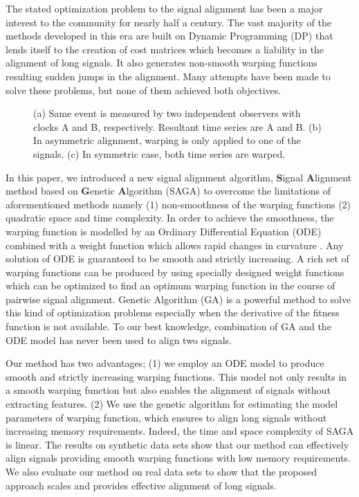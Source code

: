 \documentclass[number,1p,12pt]{elsarticle}
\begin{document}
The stated optimization problem to the signal alignment has been a major interest to the community for nearly half a century. The vast majority of the methods developed in this era are built on Dynamic Programming (DP) \cite{Bellman2003} that lends itself to the creation of cost matrices which becomes a liability in the alignment of long signals. It also generates non-smooth warping functions resulting sudden jumps in the alignment. Many attempts have been made to solve these problems, but none of them achieved both objectives. 

\begin{figure}
\centering
{}\hspace{1cm}%
\hspace{1cm}%
\caption{(a) Same event is measured by two independent observers with clocks A and B, respectively. Resultant time series are A and B.  (b) In asymmetric alignment, warping is only applied to one of the signals. (c) In symmetric case, both time series are warped.  }
\label{Figure00}
\end{figure} 

In this paper, we introduced a new signal alignment algorithm, \textbf{S}ignal \textbf{A}lignment method based on \textbf{G}enetic \textbf{A}lgorithm (SAGA) to overcome the limitations of aforementioned methods namely (1) non-smoothness of the warping functions (2)  quadratic space and time complexity. In order to achieve the smoothness, the warping function is modelled by an Ordinary Differential Equation (ODE) combined with a weight function which allows rapid changes in curvature \cite{Ramsay1998a}. Any solution of ODE is guaranteed to be smooth and strictly increasing. A rich set of warping functions can be produced by using specially designed weight functions which can be optimized to find an optimum warping function in the course of pairwise signal alignment. Genetic Algorithm (GA) is a powerful method to solve this kind of optimization problems especially when the derivative of the fitness function is not available. To our best knowledge, combination of GA and the ODE model has never been used to align two signals.

Our method has two advantages; (1) we employ an ODE model to produce smooth and strictly increasing warping functions. This model not only results in a smooth warping function but also enables the alignment of signals without extracting features. (2) We use the genetic algorithm for estimating the model parameters of warping function, which ensures to align long signals without increasing memory requirements. Indeed, the time and space complexity of SAGA is linear. The results on synthetic data sets show that our method can effectively align signals providing smooth warping functions with low memory requirements. We also evaluate our method on real data sets to show that the proposed approach scales and provides effective alignment of long signals.
\end{document}
